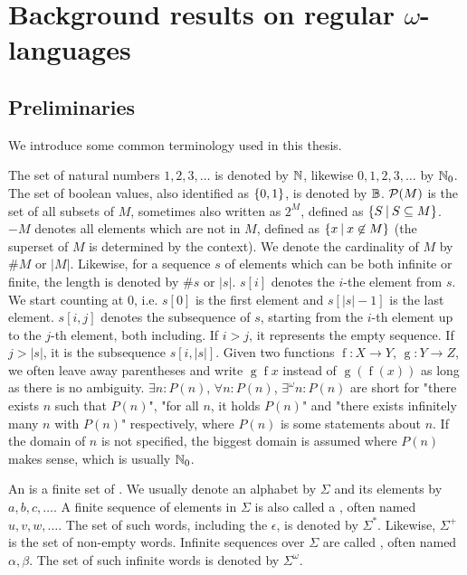 \section{Background results on regular $\omega$-languages}
\label{chapter:regOmegaLangs}

\subsection{Preliminaries}
We introduce some common terminology used in this thesis.

The set of natural numbers $1,2,3,\dots$ is denoted by $\mathbb{N}$, likewise $0,1,2,3,\dots$ by $\mathbb{N}_0$. The set of boolean values, also identified as $\Set{0,1}$, is denoted by $\mathbb{B}$. $\mathcal{P}(M)$ is the set of all subsets of $M$, sometimes also written as $2^M$, defined as $\Set{S}{S \subseteq M}$. $-M$ denotes all elements which are not in $M$, defined as $\Set{x}{x \not\in M}$ (the superset of $M$ is determined by the context). We denote the cardinality of $M$ by $\#M$ or $\left| M \right|$. Likewise, for a sequence $s$ of elements which can be both infinite or finite, the length is denoted by $\#s$ or $\left|s\right|$. $s[i]$ denotes the $i$-the element from $s$. We start counting at $0$, i.e. $s[0]$ is the first element and $s[\left|s\right|-1]$ is the last element. $s[i,j]$ denotes the subsequence of $s$, starting from the $i$-th element up to the $j$-th element, both including. If $i>j$, it represents the empty sequence. If $j > \left|s\right|$, it is the subsequence $s[i,\left|s\right|]$. Given two functions $\operatorname{f} \colon X \rightarrow Y$, $\operatorname{g} \colon Y \rightarrow Z$, we often leave away parentheses and write $\operatorname{g} \operatorname{f} x$ instead of $\operatorname{g}(\operatorname{f}(x))$ as long as there is no ambiguity. $\exists n \colon P(n)$, $\forall n \colon P(n)$, $\exists^\omega n \colon P(n)$ are short for "there exists $n$ such that $P(n)$", "for all $n$, it holds $P(n)$" and "there exists infinitely many $n$ with $P(n)$" respectively, where $P(n)$ is some statements about $n$. If the domain of $n$ is not specified, the biggest domain is assumed where $P(n)$ makes sense, which is usually $\mathbb{N}_0$.

An  is a finite set of . We usually denote an alphabet by $\Sigma$ and its elements by $a, b, c, \dots$. A finite sequence of elements in $\Sigma$ is also called a , often named $u, v, w, \dots$. The set of such words, including the  $\epsilon$, is denoted by $\Sigma^*$. Likewise, $\Sigma^+$ is the set of non-empty words. Infinite sequences over $\Sigma$ are called , often named $\alpha, \beta$. The set of such infinite words is denoted by $\Sigma^\omega$.

